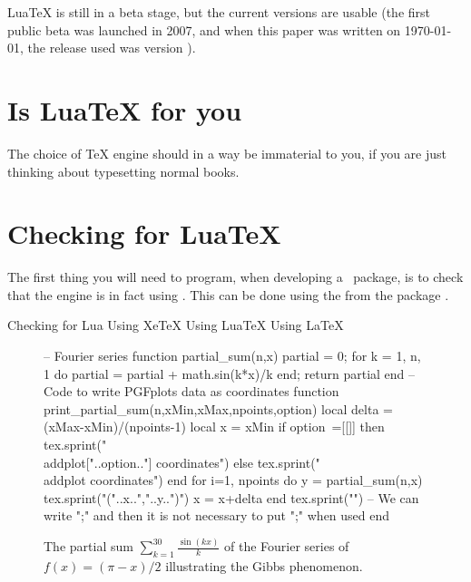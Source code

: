Lua\TeX{} is still in a beta stage, but the current versions are usable (the first public beta was launched in 2007,
and when this paper was written on \today, the release used was version \the\luatexversion). 

\section{Is LuaTeX for you}

The choice of TeX engine should in a way be immaterial to you, if you are just thinking about typesetting normal books.

\section{Checking for LuaTeX}

The first thing you will need to program, when developing a \LuaTeX\ package, is to check that the engine is in fact using \LuaTex. This can be done using the \cmd{\ifluatex} from the package . 

\begin{texexample}{Checking for Lua}{}
\ifxetex
  Using XeTeX
\else
  \ifluatex
   Using LuaTeX
  \else
   Using LaTeX
  \fi
\fi
\end{texexample}


\begin{figure}
\begin{luacode*}
-- Fourier series
function partial_sum(n,x)
    partial = 0;
    for k = 1, n, 1 do 
        partial = partial + math.sin(k*x)/k 
    end;
    return partial
end
-- Code to write PGFplots data as coordinates
function print_partial_sum(n,xMin,xMax,npoints,option)
    local delta = (xMax-xMin)/(npoints-1)
    local x = xMin
    if option~=[[]] then
        tex.sprint("\\addplot["..option.."] coordinates{")
    else
        tex.sprint("\\addplot coordinates{")
    end
    for i=1, npoints do
        y = partial_sum(n,x)
        tex.sprint("("..x..","..y..")")
        x = x+delta
    end
    tex.sprint("}") -- We can write "};" and then it is not necessary to put ";" when used
end
\end{luacode*}
\newcommand\addLUADEDplot[5][]{\directlua{print_partial_sum(#2,#3,#4,#5,[[#1]])}}
\centering
\pgfplotsset{width=15cm, height=7cm}  
\caption{The partial sum $\sum_{k=1}^{30} \frac{\sin(kx)}{k}$ of the Fourier series  of $f(x)=(\pi-x)/2$ illustrating the Gibbs phenomenon.}\label{fig:Gibbs}
\end{figure}




